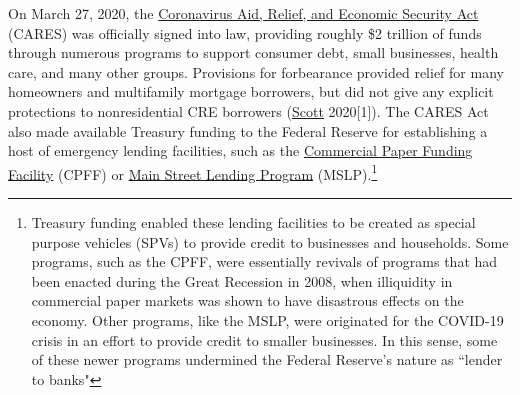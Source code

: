 \documentclass[11pt]{article} %
\begin{document}
 On March 27, 2020, the \href{https://www.congress.gov/bill/116th-congress/senate-bill/3548/text}{Coronavirus Aid, Relief, and Economic Security Act} (CARES) was officially signed into law, providing roughly \$2 trillion of funds through numerous programs to support consumer debt, small businesses, health care, and many other groups. Provisions for forbearance provided relief for many homeowners and multifamily mortgage borrowers, but did not give any explicit protections to nonresidential CRE borrowers (\hyperlink{Scott}{Scott} 2020[1]). The CARES Act also made available Treasury funding to the Federal Reserve for establishing a host of emergency lending facilities, such as the \href{https://www.federalreserve.gov/monetarypolicy/cpff.htm}{Commercial Paper Funding Facility} (CPFF) or \href{https://www.federalreserve.gov/monetarypolicy/mainstreetlending.htm}{Main Street Lending Program} (MSLP).\footnote{Treasury funding enabled these lending facilities to be created as special purpose vehicles (SPVs) to provide credit to businesses and households. Some programs, such as the CPFF, were essentially revivals of programs that had been enacted during the Great Recession in 2008, when illiquidity in commercial paper markets was shown to have disastrous effects on the economy. Other programs, like the MSLP, were originated for the COVID-19 crisis in an effort to provide credit to smaller businesses. In this sense, some of these newer programs undermined the Federal Reserve's nature as ``lender to banks"} 
 
\end{document}
